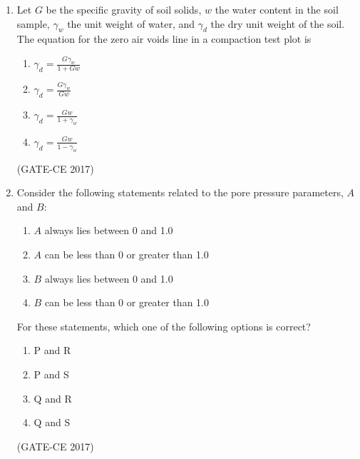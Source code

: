 \documentclass[journal,12pt,onecolumn]{article}
\theoremstyle{remark}
\begin{document}
\begin{enumerate}
    \item Let $G$ be the specific gravity of soil solids, $w$ the water content in the soil sample, $\gamma_w$ the unit weight of water, and $\gamma_d$ the dry unit weight of the soil. The equation for the zero air voids line in a compaction test plot is
    \begin{multicols}{4}
    \begin{enumerate}
        \item $\gamma_d = \frac{G\gamma_w}{1 + Gw}$
        \item $\gamma_d = \frac{G\gamma_w}{Gw}$
        \item $\gamma_d = \frac{Gw}{1 + \gamma_w}$ 
        \item $\gamma_d = \frac{Gw}{1 - \gamma_w}$  
    \end{enumerate}
    \end{multicols}
    \hfill (GATE-CE 2017)

    \item Consider the following statements related to the pore pressure parameters, $A$ and $B$:
    \begin{enumerate}
        \item $ A $ always lies between 0 and 1.0  
        \item $ A $ can be less than 0 or greater than 1.0  
        \item $ B $ always lies between 0 and 1.0  
        \item $ B $ can be less than 0 or greater than 1.0  
    \end{enumerate}
    For these statements, which one of the following options is correct?
    \begin{multicols}{4}
    \begin{enumerate}
        \item P and R  
        \item P and S  
        \item Q and R  
        \item Q and S  
    \end{enumerate}
    \end{multicols}
    \hfill (GATE-CE 2017)


\end{enumerate}
\end{document}
